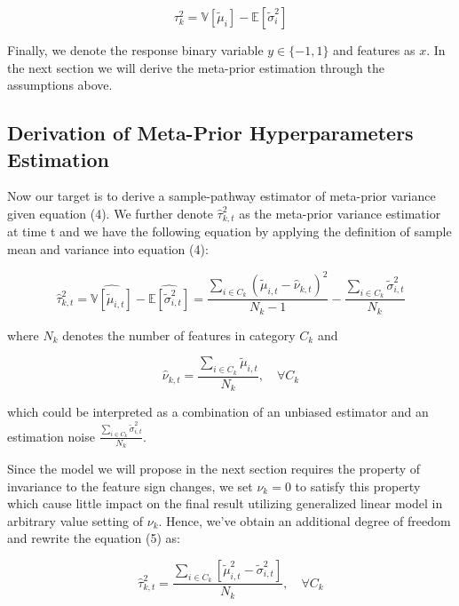 \documentclass{article}
\begin{document}
\begin{equation}
  \tau_{k}^{2}=\mathbb{V}\left[\tilde{\mu}_{i}\right]-\mathbb{E}\left[\tilde{\sigma}_{i}^{2}\right]
\end{equation}

Finally, we denote the response binary variable $y \in \{-1,1\}$ and features as $x$. In the next section we will derive the meta-prior estimation through the assumptions above.

\subsection{Derivation of Meta-Prior Hyperparameters Estimation}

Now our target is to derive a sample-pathway estimator of meta-prior variance given equation (4).
We further denote $\hat{\tau}_{k, t}^{2}$ as the meta-prior variance estimatior at time t and we have the following equation by applying the definition of sample mean and variance into equation (4):

\begin{equation}
  \hat{\tau}_{k, t}^{2}=\widehat{\mathbb{V}\left[\tilde{\mu}_{i, t}\right]}-\widehat{\mathbb{E}\left[\tilde{\sigma}_{i, t}^{2}\right]}=\frac{\sum_{i \in C_{k}}\left(\tilde{\mu}_{i, t}-\hat{\nu}_{k, t}\right)^{2}}{N_{k}-1}-\frac{\sum_{i \in C_{k}} \tilde{\sigma}_{i, t}^{2}}{N_{k}}
\end{equation}

where $N_k$ denotes the number of features in category $C_k$ and

\begin{equation}
  \hat{\nu}_{k, t}=\frac{\sum_{i \in C_{k}} \tilde{\mu}_{i, t}}{N_{k}}, \quad \forall C_{k}
\end{equation}

which could be interpreted as a combination of an unbiased estimator and an estimation noise $\frac{\sum_{i \in C_{k}} \tilde{\sigma}_{i, t}^{2}}{N_{k}}$.

Since the model we will propose in the next section requires the property of invariance to the feature sign changes, we set $\nu_k = 0$ to satisfy this property which cause little impact on the final result utilizing generalized linear model in arbitrary value setting of $\nu_k$. Hence, we've obtain an additional degree of freedom and rewrite the equation (5) as:

\begin{equation}
  \hat{\tau}_{k, t}^{2}=\frac{\sum_{i \in C_{k}}\left[\tilde{\mu}_{i, t}^{2}-\tilde{\sigma}_{i, t}^{2}\right]}{N_{k}}, \quad \forall C_{k}
\end{equation}
\end{document}
